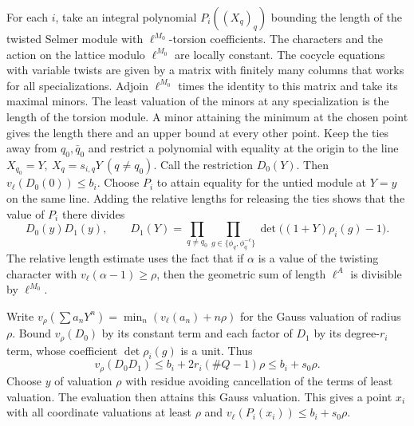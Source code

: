 For each \(i\), take an integral polynomial \(P_i((X_q)_q)\) bounding
the length of the twisted Selmer module with \(\ell^{M_0}\)-torsion
coefficients. The characters and the action on the lattice
modulo \(\ell^{M_0}\) are locally constant. The cocycle equations
with variable twists are given by a matrix with finitely many
columns that works for all specializations. Adjoin \(\ell^{M_0}\) times the identity to this
matrix and take its maximal minors. The least valuation of the
minors at any specialization is the length of the torsion module.
A minor attaining the minimum at the chosen point gives the
length there and an upper bound at every other point.
Keep the ties away from \(q_0,\bar q_0\)
and restrict a polynomial with equality at the origin to the line
\(X_{q_0}=Y,\ X_q=s_{i,q}Y\ (q\ne q_0)\). Call the restriction
\(D_0(Y)\). Then \(v_\ell(D_0(0))\le b_i\). Choose \(P_i\) to
attain equality for the untied module at \(Y=y\) on the same line.
Adding the relative lengths for releasing the ties shows that
the value of \(P_i\) there divides
\[
 D_0(y)D_1(y),\qquad
 D_1(Y)=\prod_{q\ne q_0}\prod_{g\in\{\phi_q,\phi_q^{-c}\}}
              \det\big((1+Y)\rho_i(g)-1\big).
\]
The relative length estimate uses the fact that if \(\alpha\)
is a value of the twisting character with \(v_\ell(\alpha-1)\ge\rho\),
then the geometric sum of length \(\ell^A\) is divisible by \(\ell^{M_0}\).

Write \(v_\rho(\sum a_nY^n)=\min_n(v_\ell(a_n)+n\rho)\) for the Gauss
valuation of radius \(\rho\). Bound \(v_\rho(D_0)\) by its constant
term and each factor of \(D_1\) by its degree-\(r_i\) term, whose
coefficient \(\det\rho_i(g)\) is a unit. Thus
\[
 v_\rho(D_0D_1)\le b_i+2r_i(\#Q-1)\rho\le b_i+s_0\rho .
\]
Choose \(y\) of valuation \(\rho\) with residue avoiding cancellation
of the terms of least valuation. The evaluation then attains this
Gauss valuation. This gives a point \(x_i\) with all coordinate
valuations at least \(\rho\) and \(v_\ell(P_i(x_i))\le b_i+s_0\rho\).

